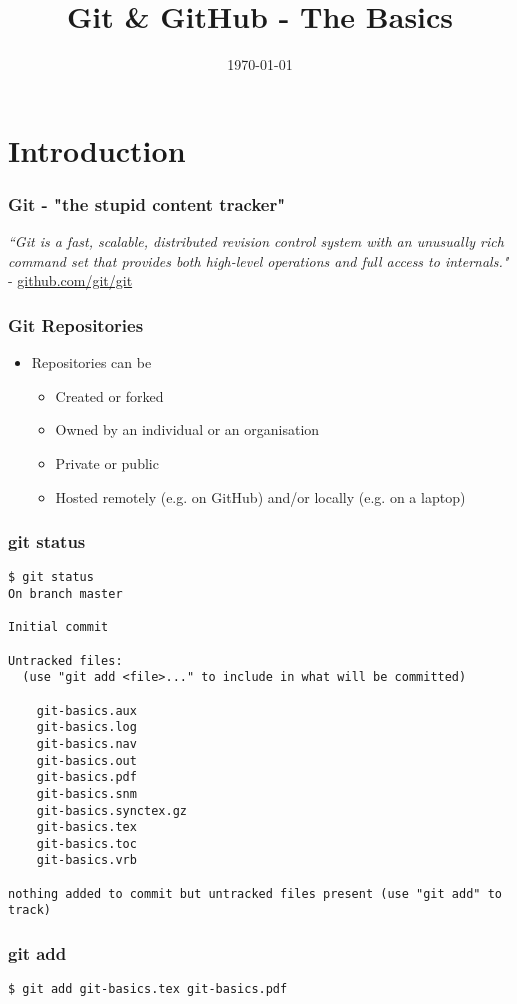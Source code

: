 \documentclass{beamer}
\title[Git]{Git \& GitHub - The Basics} %
\author{} %
\institute[] %
{
 \\ %
\medskip
\textit{chris@cjwfuller.com}
}
\date{\today}
\begin{document}
\begin{frame}
\titlepage
\end{frame}

\section{Introduction}

\begin{frame}
\frametitle{Git - "the stupid content tracker"}
\textit{``Git is a fast, scalable, distributed revision control system with an unusually rich command set that provides both high-level operations and full access to internals."} - \url{github.com/git/git}
\end{frame}


\begin{frame}
\frametitle{Git Repositories}
\begin{itemize}
	\item Repositories can be
	\begin{itemize}
		\item Created or forked
		\item Owned by an individual or an organisation
		\item Private or public
		\item Hosted remotely (e.g. on GitHub) and/or locally (e.g. on a laptop)
	\end{itemize}
\end{itemize}
\end{frame}


\begin{frame}[fragile]
\frametitle{git status}
	\scriptsize
	\begin{verbatim}
$ git status
On branch master

Initial commit

Untracked files:
  (use "git add <file>..." to include in what will be committed)

	git-basics.aux
	git-basics.log
	git-basics.nav
	git-basics.out
	git-basics.pdf
	git-basics.snm
	git-basics.synctex.gz
	git-basics.tex
	git-basics.toc
	git-basics.vrb

nothing added to commit but untracked files present (use "git add" to track)
	\end{verbatim}
\end{frame}


\begin{frame}[fragile]
\frametitle{git add}
	\scriptsize
	\begin{verbatim}
$ git add git-basics.tex git-basics.pdf
	\end{verbatim}
\end{frame}
\end{document}
